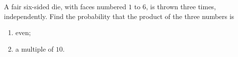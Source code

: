 A fair six-sided die, with faces numbered $1$ to $6$, is thrown three times, independently. Find the probability that the product of the three numbers is
\begin{enumerate}
\item[(a)] even;
\item[(b)] a multiple of $10$.
\end{enumerate}
